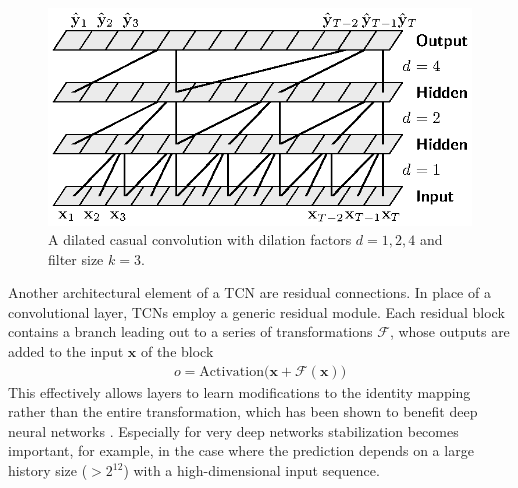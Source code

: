 \documentclass{scrartcl}
\begin{document}
\begin{figure}[htbp]
\centering
\includegraphics[scale=1]{figures/dilated_conv.eps}
\caption{A dilated casual convolution with dilation factors $d = 1,2,4$ and filter size $k=3$.}
\label{fig:dilated_convolutions} 
\end{figure}

Another architectural element of a TCN are residual connections. In place of a convolutional layer, TCNs employ a generic residual module. Each residual block contains a branch leading out to a series of transformations $\mathcal F$, whose outputs are added to the input $\mathbf x$ of the block 
\begin{align}
o = \text{Activation} \big(\mathbf x + \mathcal F(\mathbf x)\big)
\end{align}
This effectively allows layers to learn modifications to the identity mapping rather than the entire transformation, which has been shown to benefit deep neural networks \cite{He2016}. Especially for very deep networks stabilization becomes important, for example, in the case where the prediction depends on a large history size ($> 2^{12}$) with a high-dimensional input sequence. 
\end{document}
